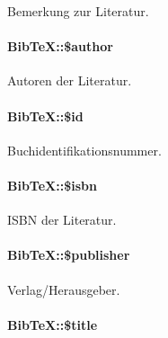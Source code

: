 Bemerkung zur Literatur. 

\hypertarget{classBibTeX_05df25974ad6f4b708e608f9a40ff186}{
\paragraph[\$author]{\setlength{\rightskip}{0pt plus 5cm}Bib\-Te\-X::\$author}\hfill}
\label{classBibTeX_05df25974ad6f4b708e608f9a40ff186}


Autoren der Literatur. 

\hypertarget{classBibTeX_13b46f23224381be3a2693f2832bb0ab}{
\paragraph[\$id]{\setlength{\rightskip}{0pt plus 5cm}Bib\-Te\-X::\$id}\hfill}
\label{classBibTeX_13b46f23224381be3a2693f2832bb0ab}


Buchidentifikationsnummer. 

\hypertarget{classBibTeX_b803583fb6c220e4e8eb1cf4252d2593}{
\paragraph[\$isbn]{\setlength{\rightskip}{0pt plus 5cm}Bib\-Te\-X::\$isbn}\hfill}
\label{classBibTeX_b803583fb6c220e4e8eb1cf4252d2593}


ISBN der Literatur. 

\hypertarget{classBibTeX_635a5c6fbed663cfd66104596e249303}{
\paragraph[\$publisher]{\setlength{\rightskip}{0pt plus 5cm}Bib\-Te\-X::\$publisher}\hfill}
\label{classBibTeX_635a5c6fbed663cfd66104596e249303}


Verlag/Herausgeber. 

\hypertarget{classBibTeX_17292d55e888dc83accb2ee131d6b8d7}{
\paragraph[\$title]{\setlength{\rightskip}{0pt plus 5cm}Bib\-Te\-X::\$title}\hfill}
\label{classBibTeX_17292d55e888dc83accb2ee131d6b8d7}



